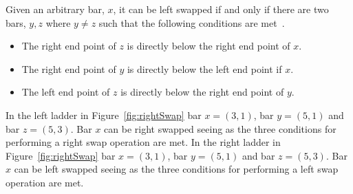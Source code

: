 Given an arbitrary bar, $x$, it can be left swapped if and only if there are two bars, $y,z$ where $y \neq z$ 
such that the following conditions are met~\cite{A1}.
\begin{itemize}
	\item The right end point of $z$ is directly below the right end point of $x$.
	\item The right end point of $y$ is directly below the left end point if $x$.
	\item The left end point of $z$ is directly below the right end point of $y$.
\end{itemize}
In the left ladder in Figure~\ref{fig:rightSwap} bar $x=(3,1)$, bar $y=(5,1)$ and bar $z=(5,3)$. Bar $x$ can be right swapped 
seeing as the three conditions for performing a right swap operation are met.
In the right ladder in Figure~\ref{fig:rightSwap} bar $x=(3,1)$, bar $y=(5,1)$ and bar $z=(5,3)$. Bar $x$ can be left swapped 
seeing as the three conditions for performing a left swap operation are met.\pagebreak
